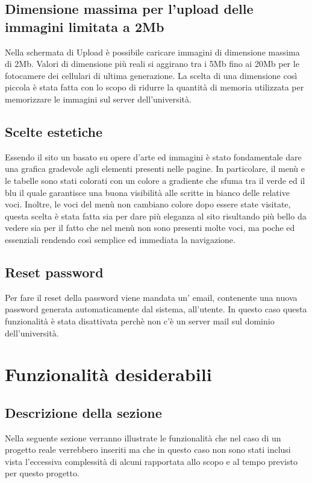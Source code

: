 \documentclass[openany, a4paper, 12pt]{report}
\begin{document}
		\section{Dimensione massima per l'upload delle immagini limitata a 2Mb}
				Nella schermata di Upload è possibile caricare immagini di dimensione massima di 2Mb. Valori di dimensione più reali si aggirano tra i 5Mb fino ai 20Mb per le fotocamere dei cellulari di ultima generazione. La scelta di una dimensione così piccola è stata fatta con lo scopo di ridurre la quantità di memoria utilizzata per memorizzare le immagini sul server dell'università.\\
		\section{Scelte estetiche}
				Essendo il sito un basato su opere d'arte ed immagini è stato fondamentale dare una grafica gradevole agli elementi presenti nelle pagine. In particolare, il menù e le tabelle sono stati colorati con un colore a gradiente che sfuma tra il verde ed il blu il quale garantisce una buona visibilità alle scritte in bianco delle relative voci. Inoltre, le voci del menù non cambiano colore dopo essere state visitate, questa scelta è stata fatta sia per dare più eleganza al sito risultando più bello da vedere sia per il fatto che nel menù non sono presenti molte voci, ma poche ed essenziali rendendo così semplice ed immediata la navigazione.
		\section{Reset password}
				Per fare il reset della password viene mandata un' email, contenente una nuova password generata automaticamente dal sistema, all'utente. In questo caso questa funzionalità è stata disattivata perchè non c'è un server mail sul dominio dell'università.
			
	\chapter{Funzionalit\`{a} desiderabili}
		\section{Descrizione della sezione}
		Nella seguente sezione verranno illustrate le funzionalità che nel caso di un progetto reale verrebbero inseriti ma che in questo caso non sono stati inclusi vista l'eccessiva complessità di alcuni rapportata allo scopo e al tempo previsto per questo progetto.
\end{document}
